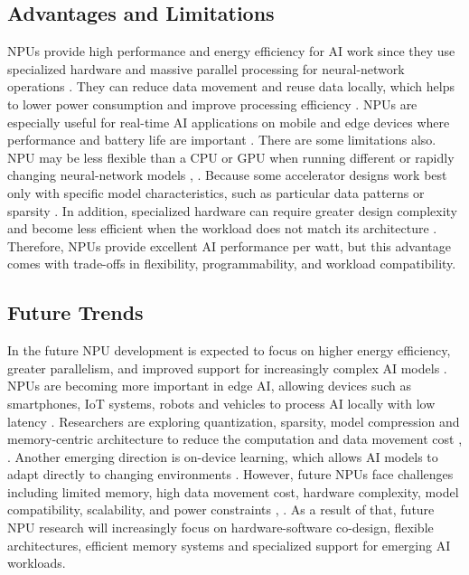 \subsection{Advantages and Limitations}
NPUs provide high performance and energy efficiency for AI work since they use specialized hardware and 
massive parallel processing for neural-network operations \cite{paper_6}. They can reduce data movement and reuse 
data locally, which helps to lower power consumption and improve processing efficiency \cite{paper_6}. NPUs are 
especially useful for real-time AI applications on mobile and edge devices where performance and battery 
life are important \cite{paper_7}. 
There are some limitations also.  NPU may be less flexible than a CPU or GPU when running different or 
rapidly changing neural-network models \cite{paper_7}, \cite{paper_8}. Because some accelerator designs work best only with 
specific model characteristics, such as particular data patterns or sparsity \cite{paper_8}. In addition, specialized 
hardware can require greater design complexity and become less efficient when the workload does not match 
its architecture \cite{paper_7}. Therefore, NPUs provide excellent AI performance per watt, but this advantage comes 
with trade-offs in flexibility, programmability, and workload compatibility.

\subsection{Future Trends}
In the future NPU development is expected to focus on higher energy efficiency, greater parallelism, and 
improved support for increasingly complex AI models \cite{paper_9}. NPUs are becoming more important in edge AI, 
allowing devices such as smartphones, IoT systems, robots and vehicles to process AI locally with low latency \cite{paper_10}. 
Researchers are exploring quantization, sparsity, model compression and memory-centric architecture to reduce the 
computation and data movement cost \cite{paper_9}, \cite{paper_11}.  
Another emerging direction is on-device learning, which allows AI models to adapt directly to changing environments \cite{paper_12}. 
However, future NPUs face challenges including limited memory, high data movement cost, hardware complexity, model 
compatibility, scalability, and power constraints \cite{paper_9}, \cite{paper_11}.  As a result of that, future NPU research will increasingly 
focus on hardware-software co-design, flexible architectures, efficient memory systems and specialized support for 
emerging AI workloads.
